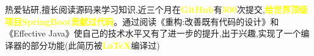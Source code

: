 

\begin{cvparagraph}

热爱钻研,擅长阅读源码来学习知识,近三个月在\textcolor{yellow}{\textbf{GitHub}}有\textcolor{yellow}{\textbf{300}}次提交,\textcolor{yellow}{\textbf{给世界顶级项目SpringBoot贡献过代码}}。通过阅读《重构:改善既有代码的设计》和《Effective Java》使自己的技术水平又有了进一步的提升,出于兴趣,实现了一个编译器的部分功能(此简历被\textcolor{yellow}{\textbf{LaTeX}}编译过)

\end{cvparagraph}



